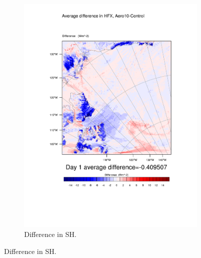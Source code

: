 \begin{figure}
\begin{subfigure}{0.48\textwidth}
		\includegraphics[width=\textwidth]{results/aero10/diff_Aero10_HFX_Day1.pdf}
		\caption{Difference in SH.}
		\label{subfig:sh_r3Day1}
	\end{subfigure}


\end{figure}
